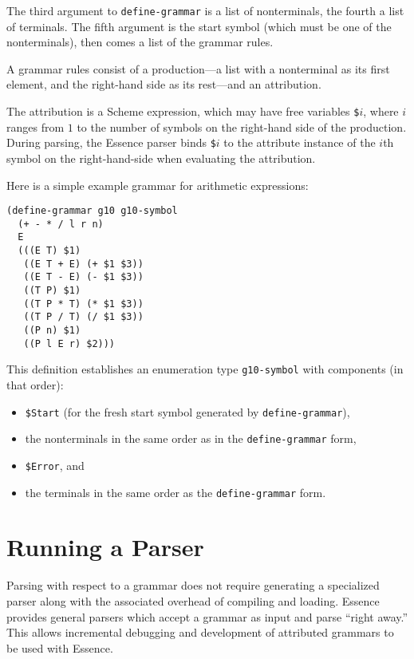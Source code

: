 \documentclass{article}
\newcommand{\codefont}[1]{\texttt{#1}}
\begin{document}
The third argument to \codefont{define-grammar} is a list of
nonterminals, the fourth a list of terminals.  The fifth argument is
the start symbol (which must be one of the nonterminals), then comes a
list of the grammar rules.

A grammar rules consist of a production---a list with a nonterminal as
its first element, and the right-hand side as its rest---and an
attribution.

The attribution is a Scheme expression, which may have free variables
\codefont{\$}$i$, where $i$ ranges from $1$ to the number of symbols
on the right-hand side of the production.  During parsing, the Essence
parser binds \codefont{\$}$i$ to the attribute instance of the $i$th
symbol on the right-hand-side when evaluating the attribution.

Here is a simple example grammar for arithmetic expressions:
%
\begin{verbatim}
(define-grammar g10 g10-symbol
  (+ - * / l r n)
  E
  (((E T) $1)
   ((E T + E) (+ $1 $3))
   ((E T - E) (- $1 $3))
   ((T P) $1)
   ((T P * T) (* $1 $3))
   ((T P / T) (/ $1 $3))
   ((P n) $1)
   ((P l E r) $2)))
\end{verbatim}
%
This definition establishes an enumeration type \codefont{g10-symbol}
with components (in that order):
%
\label{list:grammar-enum}
%
\begin{itemize}
\item \codefont{\$Start} (for the fresh start symbol generated by
  \codefont{define-grammar}),
\item the nonterminals in the same order as in the
  \codefont{define-grammar} form,
\item \codefont{\$Error}, and
\item the terminals in the same order as the \codefont{define-grammar}
  form.
\end{itemize}

\section{Running a Parser}
\label{sec:running-a-parser}

Parsing with respect to a grammar does not require generating a
specialized parser along with the associated overhead of compiling and
loading.  Essence provides general parsers which accept a grammar as
input and parse ``right away.''  This allows incremental debugging and 
development of attributed grammars to be used with Essence.
\end{document}
